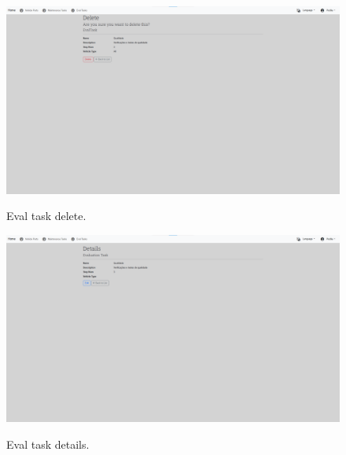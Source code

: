 \begin{figure}[htbp]
  \caption{Eval task delete.}
  \centering
  \includegraphics[width=\textwidth]{figs/Implementation/dealershipAdmin/evalDelete}
  \label{fig:evalDelete}
\end{figure}

\begin{figure}[htbp]
  \caption{Eval task details.}
  \centering
  \includegraphics[width=\textwidth]{figs/Implementation/dealershipAdmin/evalDetails}
  \label{fig:evalDetails}
\end{figure}

